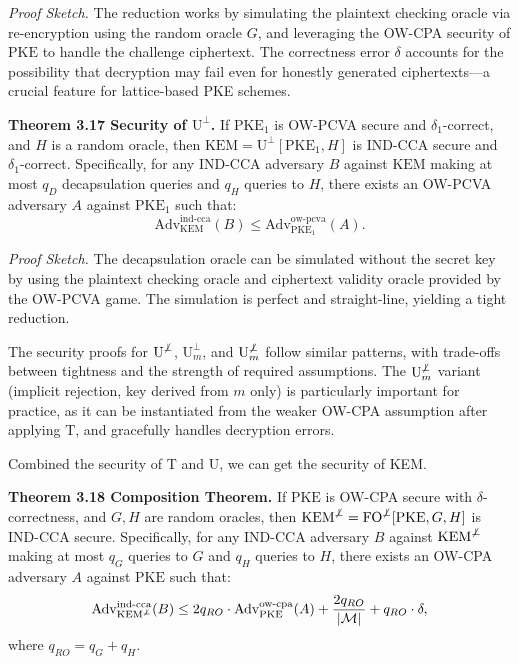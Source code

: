 \noindent\textit{Proof Sketch.} The reduction works by simulating the plaintext checking oracle via re-encryption using the random oracle $G$, and leveraging the OW-CPA security of $\text{PKE}$ to handle the challenge ciphertext. The correctness error $\delta$ accounts for the possibility that decryption may fail even for honestly generated ciphertexts---a crucial feature for lattice-based PKE schemes.

\noindent\textbf{Theorem 3.17 Security of $\text{U}^{\bot}$.} If $\text{PKE}_1$ is OW-PCVA secure and $\delta_1$-correct, and $H$ is a random oracle, then $\text{KEM} = \text{U}^{\bot}[\text{PKE}_1, H]$ is IND-CCA secure and $\delta_1$-correct. Specifically, for any IND-CCA adversary $B$ against $\text{KEM}$ making at most $q_D$ decapsulation queries and $q_H$ queries to $H$, there exists an OW-PCVA adversary $A$ against $\text{PKE}_1$ such that:
$$
\text{Adv}_{\text{KEM}}^{\text{ind-cca}}(B) \le \text{Adv}_{\text{PKE}_1}^{\text{ow-pcva}}(A).
$$

\noindent\textit{Proof Sketch.} The decapsulation oracle can be simulated without the secret key by using the plaintext checking oracle and ciphertext validity oracle provided by the OW-PCVA game. The simulation is perfect and straight-line, yielding a tight reduction.

The security proofs for $\text{U}^{\not\bot}$, $\text{U}_m^{\bot}$, and $\text{U}_m^{\not\bot}$ follow similar patterns, with trade-offs between tightness and the strength of required assumptions. The $\text{U}_m^{\not\bot}$ variant (implicit rejection, key derived from $m$ only) is particularly important for practice, as it can be instantiated from the weaker OW-CPA assumption after applying $\text{T}$, and gracefully handles decryption errors.

Combined the security of $\text{T}$ and $\text{U}$, we can get the security of KEM.

\noindent\textbf{Theorem 3.18 Composition Theorem.} If $\text{PKE}$ is OW-CPA secure with $\delta$-correctness, and $G, H$ are random oracles, then $\text{KEM}^{\not\bot}=\text{FO}^{\not\bot}[\text{PKE}, G, H]$ is IND-CCA secure. Specifically, for any IND-CCA adversary $B$ against $\text{KEM}^{\not\bot}$ making at most $q_G$ queries to $G$ and $q_H$ queries to $H$, there exists an OW-CPA adversary $A$ against $\text{PKE}$ such that:
$$
\text{Adv}_{\text{KEM}^{\not\bot}}^{\text{ind-cca}}(B) \le 2q_{RO}\cdot\text{Adv}_{\text{PKE}}^{\text{ow-cpa}}(A) + \frac{2q_{RO}}{|\mathcal{M}|} + q_{RO} \cdot \delta,
$$
where $q_{RO} = q_G + q_H$.

